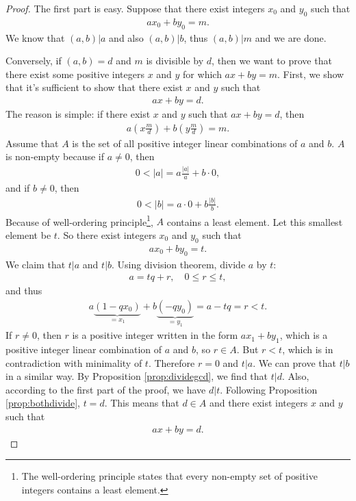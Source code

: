 \documentclass{subfile}
\begin{document}
	\begin{proof}
		The first part is easy. Suppose that there exist integers $x_0$ and $y_0$ such that
		\begin{align*} ax_0 + by_0 = m.\end{align*}
		We know that $(a,b)|a$ and also $(a,b)|b$, thus $(a,b) | m$ and we are done.
		
		Conversely, if $(a,b)=d$ and $m$ is divisible by $d$, then we want to prove that there exist some positive integers $x$ and $y$ for which $ax+by=m$. First, we show that it's sufficient to show that there exist $x$ and $y$ such that
		\begin{align*} ax + by = d.\end{align*}
		The reason is simple: if there exist $x$ and $y$ such that $ax + by = d$, then
		\begin{align*} a\left( x \frac{m}{d} \right)  + b \left( y \frac{m}{d} \right) = m.\end{align*}
		Assume that $A$ is the set of all positive integer linear combinations of $a$ and $b$. $A$ is non-empty because if $a \neq 0$, then
		\begin{align*}	0<|a| = a\frac{|a|}{a} + b\cdot 0, \end{align*}
		and if $b \neq 0$, then
		\begin{align*}	0<|b| =  a\cdot 0 + b \frac{|b|}{b}. \end{align*}
		Because of well-ordering principle\footnote{The well-ordering principle states that every non-empty set of positive integers contains a least element.}, $A$ contains a least element. Let this smallest element be $t$. So there exist integers $x_0$ and $y_0$ such that
		\begin{align*} ax_0 + by_0 = t.\end{align*}
		We claim that $t|a$ and $t|b$. Using division theorem, divide $a$ by $t$:
		\begin{align*} a = tq+r, \quad 0 \leq r \leq t,\end{align*}
		and thus
		\begin{align*} a\underbrace{(1-qx_0)}_{=x_1}+b\underbrace{(-qy_0)}_{=y_1}=a-tq=r<t.	\end{align*}
		If $r \neq 0$, then $r$ is a positive integer written in the form $ax_1+by_1$, which is a positive integer linear combination of $a$ and $b$, so $r \in A$. But $r<t$, which is in contradiction with minimality of $t$. Therefore $r=0$ and $t|a$. We can prove that $t|b$ in a similar way. By Proposition \ref{prop:dividegcd}, we find that $t|d$. Also, according to the first part of the proof, we have $d|t$. Following Proposition \ref{prop:bothdivide}, $t=d$. This means that $d \in A$ and there exist integers $x$ and $y$ such that
		\begin{align*} ax + by = d.\end{align*}
	\end{proof}
	
\end{document}
